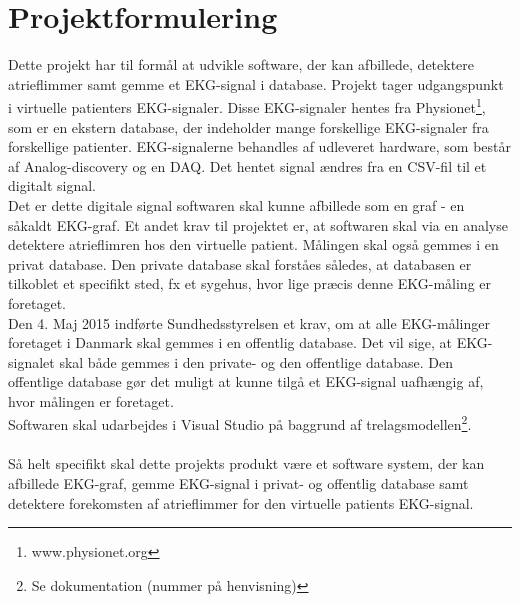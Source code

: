 \chapter{Projektformulering}

Dette projekt har til formål at udvikle software, der kan afbillede, detektere atrieflimmer samt gemme et EKG-signal i database. Projekt tager udgangspunkt i virtuelle patienters EKG-signaler. Disse EKG-signaler hentes fra Physionet\footnote{www.physionet.org}, som er en ekstern database, der indeholder mange forskellige EKG-signaler fra forskellige patienter. EKG-signalerne behandles af udleveret hardware, som består af Analog-discovery og en DAQ. Det hentet signal ændres fra en CSV-fil til et digitalt signal. \\
Det er dette digitale signal softwaren skal kunne afbillede som en graf - en såkaldt EKG-graf. Et andet krav til projektet er, at softwaren skal via en analyse detektere atrieflimren hos den virtuelle patient. Målingen skal også gemmes i en privat database. Den private database skal forståes således, at databasen er tilkoblet et specifikt sted, fx et sygehus, hvor lige præcis denne EKG-måling er foretaget. \\
Den 4. Maj 2015 indførte Sundhedsstyrelsen et krav, om at alle EKG-målinger foretaget i Danmark skal gemmes i en offentlig database. Det vil sige, at EKG-signalet skal både gemmes i den private- og den offentlige database. Den offentlige database gør det muligt at kunne tilgå et EKG-signal uafhængig af, hvor målingen er foretaget.\\
Softwaren skal udarbejdes i Visual Studio på baggrund af trelagsmodellen\footnote{Se dokumentation (nummer på henvisning)}.\\ \\
Så helt specifikt skal dette projekts produkt være et software system, der kan afbillede EKG-graf, gemme EKG-signal i privat- og offentlig database samt detektere forekomsten af atrieflimmer for den virtuelle patients EKG-signal.  